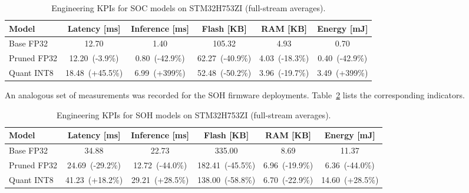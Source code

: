 \documentclass[final,3p,times]{elsarticle}
\begin{document}
\begin{table}[t!]
      \centering
      \caption{Engineering KPIs for SOC models on STM32H753ZI (full-stream averages).}
      \label{tab:kpi}
        \begin{tabular}{lccccc}
            \toprule
            Model & Latency [ms] & Inference [ms] & Flash [KB] & RAM [KB] & Energy [mJ] \\
            \midrule
            Base FP32 & 12.70 & 1.40 & 105.32 & 4.93 & 0.70 \\
            Pruned FP32 & 12.20~\textcolor{mgGreen}{(-3.9\%)} & 0.80~\textcolor{mgGreen}{(-42.9\%)} & 62.27~\textcolor{mgGreen}{(-40.9\%)} & 4.03~\textcolor{mgGreen}{(-18.3\%)} & 0.40~\textcolor{mgGreen}{(-42.9\%)} \\
            Quant INT8 & 18.48~\textcolor{mgRed}{(+45.5\%)} & 6.99~\textcolor{mgRed}{(+399\%)} & 52.48~\textcolor{mgGreen}{(-50.2\%)} & 3.96~\textcolor{mgGreen}{(-19.7\%)} & 3.49~\textcolor{mgRed}{(+399\%)} \\
            \bottomrule
        \end{tabular}
  \end{table}
An analogous set of measurements was recorded for the SOH firmware deployments. Table~\ref{tab:kpi_soh} lists the corresponding indicators.
  \begin{table}[t!]
      \centering
      \caption{Engineering KPIs for SOH models on STM32H753ZI (full-stream averages).}
      \label{tab:kpi_soh}
        \begin{tabular}{lccccc}
            \toprule
            Model & Latency [ms] & Inference [ms] & Flash [KB] & RAM [KB] & Energy [mJ] \\
            \midrule
            Base FP32 & 34.88 & 22.73 & 335.00 & 8.69 & 11.37 \\
            Pruned FP32 & 24.69~\textcolor{mgGreen}{(-29.2\%)} & 12.72~\textcolor{mgGreen}{(-44.0\%)} & 182.41~\textcolor{mgGreen}{(-45.5\%)} & 6.96~\textcolor{mgGreen}{(-19.9\%)} & 6.36~\textcolor{mgGreen}{(-44.0\%)} \\
            Quant INT8 & 41.23~\textcolor{mgRed}{(+18.2\%)} & 29.21~\textcolor{mgRed}{(+28.5\%)} & 138.00~\textcolor{mgGreen}{(-58.8\%)} & 6.70~\textcolor{mgGreen}{(-22.9\%)} & 14.60~\textcolor{mgRed}{(+28.5\%)} \\
            \bottomrule
        \end{tabular}
\end{table}
\end{document}
